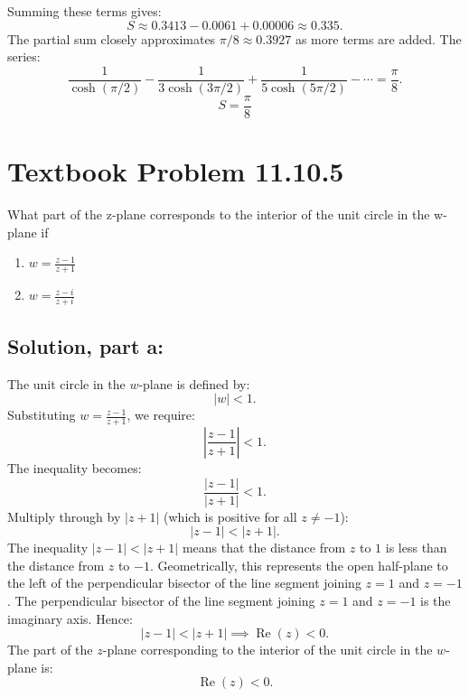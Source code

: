 \documentclass[12pt]{article}
\begin{document}
        Summing these terms gives:
        \[
        S \approx 0.3413 - 0.0061 + 0.00006 \approx 0.335.
        \]
        The partial sum closely approximates \(\pi/8 \approx 0.3927\) as more terms are added.
        The series:
        \[
        \frac{1}{\cosh(\pi/2)} - \frac{1}{3\cosh(3\pi/2)} + \frac{1}{5\cosh(5\pi/2)} - \cdots = \frac{\pi}{8}.
        \]
        \[
        \boxed{S = \frac{\pi}{8}}
        \]

\section*{Textbook Problem 11.10.5}
    What part of the z-plane corresponds to the interior of the unit circle in the w-plane if 
    \begin{enumerate}
        \item [(a)] $w = \frac{z - 1}{z + 1}$
        \item [(b)] $w = \frac{z - i}{z + i}$
    \end{enumerate}

    \subsection*{Solution, part a:}
        The unit circle in the \(w\)-plane is defined by:
        \[
        |w| < 1.
        \]
        Substituting \(w = \frac{z-1}{z+1}\), we require:
        \[
        \left|\frac{z-1}{z+1}\right| < 1.
        \]
        The inequality becomes:
        \[
        \frac{|z-1|}{|z+1|} < 1.
        \]
        Multiply through by \(|z+1|\) (which is positive for all \(z \neq -1\)):
        \[
        |z-1| < |z+1|.
        \]
        The inequality \( |z-1| < |z+1| \) means that the distance from \(z\) to \(1\) is less than the distance from \(z\) to \(-1\). Geometrically, this represents the open half-plane to the left of the perpendicular bisector of the line segment joining \(z = 1\) and \(z = -1\).
        The perpendicular bisector of the line segment joining \(z = 1\) and \(z = -1\) is the imaginary axis. Hence:
        \[
        |z-1| < |z+1| \implies \operatorname{Re}(z) < 0.
        \]
        The part of the \(z\)-plane corresponding to the interior of the unit circle in the \(w\)-plane is:
        \[
        \boxed{\operatorname{Re}(z) < 0}.
        \]
\end{document}

